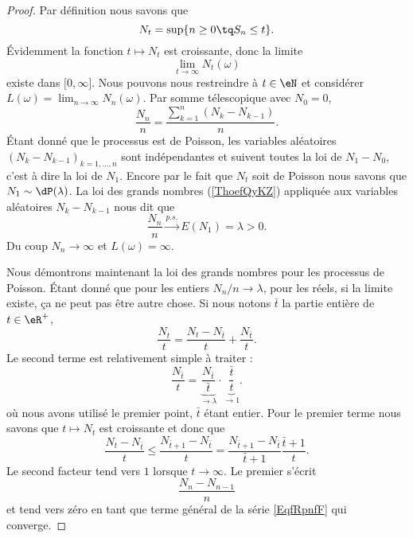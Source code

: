 \begin{proof}
    Par définition nous savons que
    \begin{equation}
        N_t=\sup\{ n\geq 0\tq S_n\leq t \}.
    \end{equation}
    Évidemment la fonction \( t\mapsto N_t\) est croissante, donc la limite
    \begin{equation}
        \lim_{t\to \infty} N_t(\omega)
    \end{equation}
    existe dans \( \mathopen[ 0 , \infty \mathclose]\). Nous pouvons nous restreindre à \( t\in \eN\) et considérer \( L(\omega)=\lim_{n\to \infty} N_n(\omega)\). Par somme télescopique avec \( N_0=0\),
    \begin{equation}    \label{EqfRpnfF}
        \frac{ N_n }{ n }=\frac{ \sum_{k=1}^n(N_k-N_{k-1}) }{ n }.
    \end{equation}
    Étant donné que le processus est de Poisson, les variables aléatoires \( (N_k-N_{k-1})_{k=1,\ldots, n}\) sont indépendantes et suivent toutes la loi de \( N_1-N_0\), c'est à dire la loi de \( N_1\). Encore par le fait que \( N_t\) soit de Poisson nous savons que \( N_1\sim\dP(\lambda)\). La loi des grands nombres (\ref{ThoefQyKZ}) appliquée aux variables aléatoires \( N_k-N_{k-1}\) nous dit que
    \begin{equation}
        \frac{ N_n }{ n }\stackrel{p.s.}{\longrightarrow}E(N_1)=\lambda>0.
    \end{equation}
    Du coup \( N_n\to \infty\) et \( L(\omega)=\infty\).

    Nous démontrons maintenant la loi des grands nombres pour les processus de Poisson. Étant donné que pour les entiers \( N_n/n\to \lambda\), pour les réels, si la limite existe, ça ne peut pas être autre chose. Si nous notons \( \bar t\) la partie entière de \( t\in \eR^+\),
    \begin{equation}
        \frac{ N_t }{ t }=\frac{ N_t-N_{\bar t} }{ t }+\frac{ N_{\bar t} }{ t }.
    \end{equation}
    Le second terme est relativement simple à traiter :
    \begin{equation}
        \frac{ N_{\bar t} }{ t }=\underbrace{\frac{ N_{\bar t} }{ \bar t }}_{\to \lambda}\cdot\underbrace{\frac{ \bar t }{ t }}_{\to 1}.
    \end{equation}
    où nous avons utilisé le premier point, \( \bar t\) étant entier. Pour le premier terme nous savons que \( t\mapsto N_t\) est croissante et donc que
    \begin{equation}
        \frac{ N_t-N_{\bar t} }{ t }\leq \frac{ N_{\bar t+1}-N_{\bar t}}{ t }=\frac{ N_{\bar t+1}-N_{\bar t} }{ \bar t+1 }\frac{ \bar t+1 }{ t }.
    \end{equation}
    Le second facteur tend vers \( 1\) lorsque \( t\to \infty\). Le premier s'écrit
    \begin{equation}    \label{eqtPgPpJ}
        \frac{ N_n-N_{n-1} }{ n }
    \end{equation}
    et tend vers zéro en tant que terme général de la série \eqref{EqfRpnfF} qui converge.
\end{proof}

